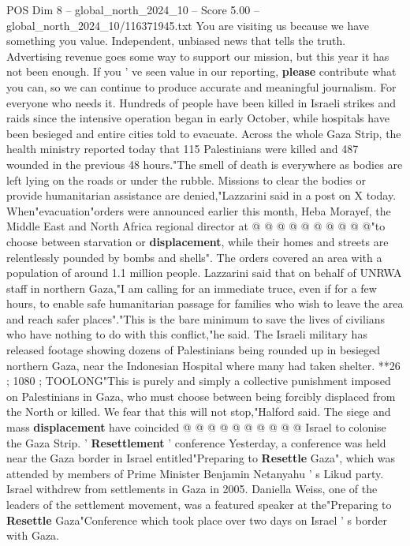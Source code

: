 \begin{textsample}{POS Dim 8 – global\_north\_2024\_10 – Score 5.00 – global\_north\_2024\_10/116371945.txt}  \label{ex:f8_pos_242}
You are visiting us because we have something you value.
Independent, unbiased news that tells the truth.
Advertising revenue goes some way to support our mission, but this year it has not been enough.
If you ' ve seen value in our reporting, \textbf{please} contribute what you can, so we can continue to produce accurate and meaningful journalism.
For everyone who needs it.
Hundreds of people have been killed in Israeli strikes and raids since the intensive operation began in early October, while hospitals have been besieged and entire cities told to evacuate.
Across the whole Gaza Strip, the health ministry reported today that 115 Palestinians were killed and 487 wounded in the previous 48 hours."The smell of death is everywhere as bodies are left lying on the roads or under the rubble.
Missions to clear the bodies or provide humanitarian assistance are denied,"Lazzarini said in a post on X today.
When"evacuation"orders were announced earlier this month, Heba Morayef, the Middle East and North Africa regional director at @ @ @ @ @ @ @ @ @ @"to choose between starvation or \textbf{displacement}, while their homes and streets are relentlessly pounded by bombs and shells".
The orders covered an area with a population of around 1.1 million people.
Lazzarini said that on behalf of UNRWA staff in northern Gaza,"I am calling for an immediate truce, even if for a few hours, to enable safe humanitarian passage for families who wish to leave the area and reach safer places"."This is the bare minimum to save the lives of civilians who have nothing to do with this conflict,"he said.
The Israeli military has released footage showing dozens of Palestinians being rounded up in besieged northern Gaza, near the Indonesian Hospital where many had taken shelter. **26 ; 1080 ; TOOLONG"This is purely and simply a collective punishment imposed on Palestinians in Gaza, who must choose between being forcibly displaced from the North or killed.
We fear that this will not stop,"Halford said.
The siege and mass \textbf{displacement} have coincided @ @ @ @ @ @ @ @ @ @ Israel to colonise the Gaza Strip. ' \textbf{Resettlement} ' conference Yesterday, a conference was held near the Gaza border in Israel entitled"Preparing to \textbf{Resettle} Gaza", which was attended by members of Prime Minister Benjamin Netanyahu ' s Likud party.
Israel withdrew from settlements in Gaza in 2005.
Daniella Weiss, one of the leaders of the settlement movement, was a featured speaker at the"Preparing to \textbf{Resettle} Gaza"Conference which took place over two days on Israel ' s border with Gaza.

\end{textsample}
